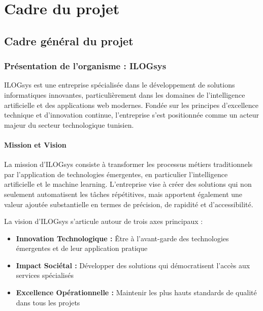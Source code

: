
\chapter{Cadre du projet}

\section{Cadre général du projet}

\subsection{Présentation de l'organisme : ILOGsys}

ILOGsys est une entreprise spécialisée dans le développement de solutions informatiques innovantes, particulièrement dans les domaines de l'intelligence artificielle et des applications web modernes. Fondée sur les principes d'excellence technique et d'innovation continue, l'entreprise s'est positionnée comme un acteur majeur du secteur technologique tunisien.

\subsubsection{Mission et Vision}

La mission d'ILOGsys consiste à transformer les processus métiers traditionnels par l'application de technologies émergentes, en particulier l'intelligence artificielle et le machine learning. L'entreprise vise à créer des solutions qui non seulement automatisent les tâches répétitives, mais apportent également une valeur ajoutée substantielle en termes de précision, de rapidité et d'accessibilité.

La vision d'ILOGsys s'articule autour de trois axes principaux :
\begin{itemize}
    \item \textbf{Innovation Technologique :} Être à l'avant-garde des technologies émergentes et de leur application pratique
    \item \textbf{Impact Sociétal :} Développer des solutions qui démocratisent l'accès aux services spécialisés
    \item \textbf{Excellence Opérationnelle :} Maintenir les plus hauts standards de qualité dans tous les projets
\end{itemize}

